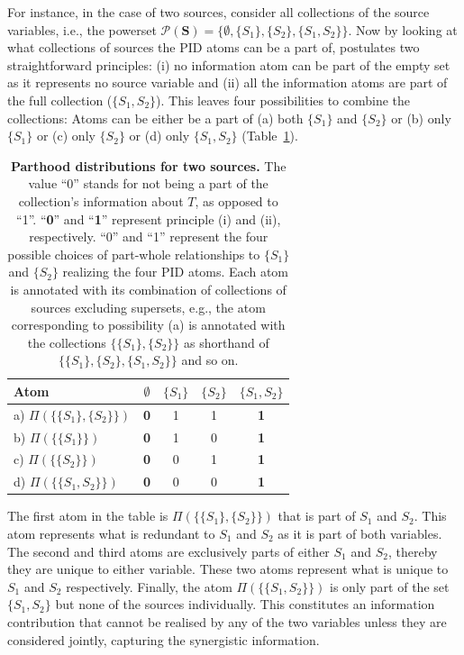 \documentclass[10pt]{article}
\theoremstyle{definition}
\theoremstyle{plain}
\begin{document}
For instance, in the case of two sources, consider all collections of the source variables, i.e., the powerset $\mathcal P(\bm S)=\{\emptyset, \{S_1\}, \{S_2\}, \{S_1, S_2\}\}.$ Now by looking at what collections of sources the PID atoms can be a part of, \cite{gutknecht_bits_2021} postulates two straightforward principles: (i) no information atom can be part of the empty set as it represents no source variable and (ii) all the information atoms are part of the full collection ($\{S_1, S_2\}$). This leaves four possibilities to combine the collections: Atoms can be either be a part of (a) both $\{S_1\}$ and $\{S_2\}$ or (b) only $\{S_1\}$ or (c) only $\{S_2\}$ or (d) only $\{S_1, S_2\}$ (Table~\ref{tab:parthood-bi}).
\begin{table}[h!]
    \centering
    \begin{tabular}{|l|c|c|c|c|}
    \hline
    Atom                            &$\emptyset$    &$\{S_1\}$          & $\{S_2\}$         & $\{S_1,S_2\}$\\
    \hline
    a) $\Pi(\{\{S_1\},\{S_2\}\})$   &{\bf 0}        &{\color{red}1}     &{\color{red}1}     &{\bf 1}\\
    b) $\Pi(\{\{S_1\}\})$           &{\bf 0}        &{\color{red}1}     &{\color{red}0}     &{\bf 1}\\
    c) $\Pi(\{\{S_2\}\})$           &{\bf 0}        &{\color{red}0}     &{\color{red}1}     &{\bf 1}\\
    d) $\Pi(\{\{S_1,S_2\}\})$       &{\bf 0}        &{\color{red}0}     &{\color{red}0}     &{\bf 1}\\
    \hline
    \end{tabular}
\caption{\textbf{Parthood distributions for two sources.} The value ``0'' stands for not being a part of the collection's information about $T$, as opposed to ``1''. ``{\bf0}'' and ``{\bf1}'' represent principle (i) and (ii), respectively. ``{\color{red}0}'' and ``{\color{red}1}'' represent the four possible choices of part-whole relationships to $\{S_1\}$ and $\{S_2\}$ realizing the four PID atoms. Each atom is annotated with its combination of collections of sources excluding supersets, e.g., the atom corresponding to possibility (a) is annotated with the collections $\{\{S_1\},\{S_2\}\}$ as shorthand of $\{\{S_1\},\{S_2\}, \{S_1,S_2\}\}$ and so on.}\label{tab:parthood-bi}
\end{table}

The first atom in the table is $\Pi(\{\{S_1\},\{S_2\}\})$ that is part of $S_1$ and $S_2$. This atom represents what is redundant to $S_1$ and $S_2$ as it is part of both variables. The second and third atoms are exclusively parts of either $S_1$ and $S_2$, thereby they are unique to either variable. These two atoms represent what is unique to $S_1$ and $S_2$ respectively. Finally, the atom $\Pi(\{\{S_1, S_2\}\})$ is only part of the set $\{S_1,S_2\}$ but none of the sources individually. This constitutes an information contribution that cannot be realised by any of the two variables unless they are considered jointly, capturing the synergistic information.
\end{document}
